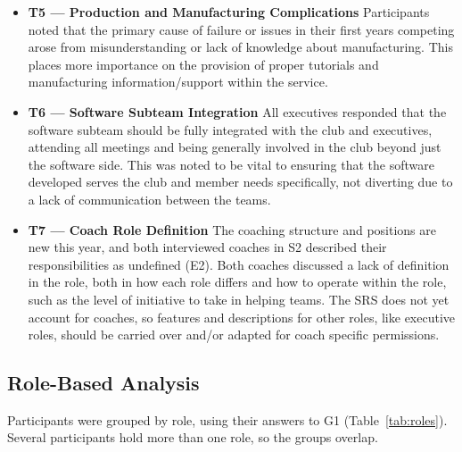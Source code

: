 \documentclass{article}
\begin{document}
\begin{itemize}
      \item \textbf{T5 --- Production and Manufacturing Complications} \newline
      Participants noted that the primary cause of failure or issues in their first years competing arose from misunderstanding or 
      lack of knowledge about manufacturing. This places more importance on the provision of proper tutorials and manufacturing information/support 
      within the service.

      \item \textbf{T6 --- Software Subteam Integration} \newline
      All executives responded that the software subteam should be fully integrated with the club and executives, attending all meetings 
      and being generally involved in the club beyond just the software side. This was noted to be vital to ensuring that the software developed 
      serves the club and member needs specifically, not diverting due to a lack of communication between the teams.

      \item \textbf{T7 --- Coach Role Definition} \newline
      The coaching structure and positions are new this year, and both interviewed coaches in S2 described their responsibilities as undefined (E2). 
      Both coaches discussed a lack of definition in the role, both in how each role differs and how to operate within the role, such as 
      the level of initiative to take in helping teams. The SRS does not yet account for coaches, so features and descriptions for other roles, like executive roles, should be carried 
      over and/or adapted for coach specific permissions.
      


\end{itemize}


\subsection{Role-Based Analysis}
\label{sec:roles}

Participants were grouped by role, using their answers to G1
(Table~\ref{tab:roles}). Several participants hold more than one role, so the
groups overlap.
\end{document}
